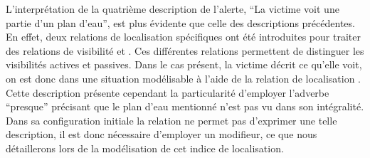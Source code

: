 L'interprétation de la quatrième description de l'alerte, \enquote{La
  victime voit une partie d'un plan d'eau}, est plus évidente que
celle des descriptions précédentes. En effet, deux relations de
localisation spécifiques ont été introduites pour traiter des
relations de visibilité  et
. Ces différentes relations permettent de
distinguer les visibilités actives et passives. Dans le cas présent,
la victime décrit ce qu'elle voit, on est donc dans une situation
modélisable à l'aide de la relation de localisation
. Cette description présente cependant la
particularité d'employer l’adverbe \enquote{presque} précisant que le
plan d'eau mentionné n'est pas vu dans son intégralité. Dans sa
configuration initiale la relation  ne
permet pas d'exprimer une telle description, il est donc nécessaire
d'employer un modifieur, ce que nous détaillerons lors de la
modélisation de cet indice de localisation.

